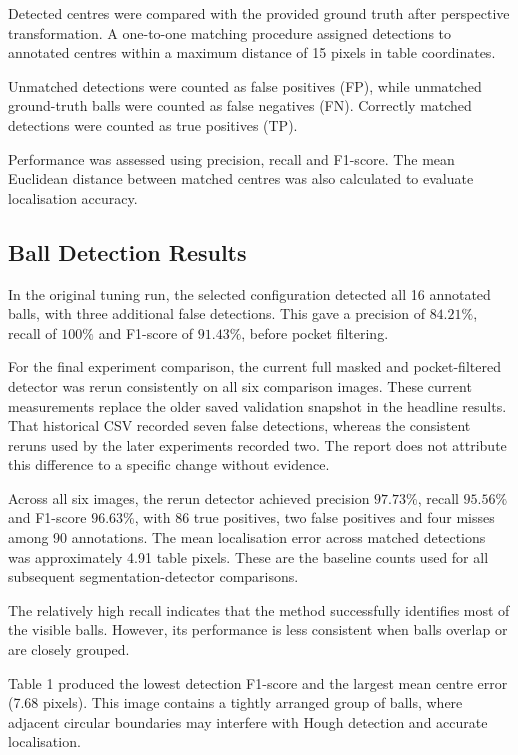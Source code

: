 \documentclass[10pt,a4paper]{article}
\begin{document}
Detected centres were compared with the provided ground truth after 
perspective transformation. A one-to-one matching procedure assigned 
detections to annotated centres within a maximum distance of 15 pixels 
in table coordinates.

Unmatched detections were counted as false positives (FP), while unmatched 
ground-truth balls were counted as false negatives (FN). Correctly matched 
detections were counted as true positives (TP).

Performance was assessed using precision, recall and F1-score. The mean 
Euclidean distance between matched centres was also calculated to evaluate 
localisation accuracy.

\subsection{Ball Detection Results}

In the original tuning run, the selected configuration detected all 16 annotated
balls, with three additional false detections. This gave a precision of 
$84.21\%$, recall of $100\%$ and F1-score of $91.43\%$, before pocket filtering.

For the final experiment comparison, the current full masked and pocket-filtered
detector was rerun consistently on all six comparison images. These current
measurements replace the older saved validation snapshot in the headline
results. That historical CSV recorded seven false detections, whereas the
consistent reruns used by the later experiments recorded two. The report
does not attribute this difference to a specific change without evidence.



Across all six images, the rerun detector achieved precision $97.73\%$,
recall $95.56\%$ and F1-score $96.63\%$, with 86 true positives,
two false positives and four misses among 90 annotations. The mean
localisation error across matched detections was approximately 4.91
table pixels. These are the baseline counts used for all subsequent
segmentation-detector comparisons.

The relatively high recall indicates that the method successfully identifies 
most of the visible balls. However, its performance is less consistent when 
balls overlap or are closely grouped.

Table 1 produced the lowest detection F1-score and the largest mean centre 
error (7.68 pixels). This image contains a tightly arranged group of balls, 
where adjacent circular boundaries may interfere with Hough detection and 
accurate localisation.
\end{document}
